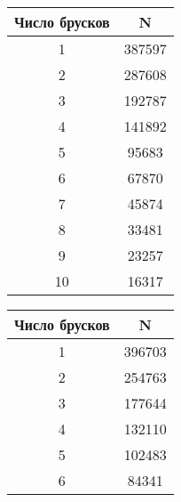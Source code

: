 \documentclass[12pt, a4paper, reqno]{article}
\begin{document}
        \begin{minipage}{0.33\textwidth}
            \centering
            \begin{tabular}{|c|c|}
                \hline
                Число брусков & N       \\ \hline\hline
                1             & 387597  \\ \hline
                2             & 287608  \\ \hline
                3             & 192787  \\ \hline
                4             & 141892  \\ \hline
                5             & 95683   \\ \hline
                6             & 67870   \\ \hline
                7             & 45874   \\ \hline
                8             & 33481   \\ \hline
                9             & 23257   \\ \hline
                10            & 16317   \\ \hline
            \end{tabular}
            \label{table:Al}
        \end{minipage}
        \begin{minipage}{0.33\textwidth}
            \centering
            \begin{tabular}{|c|c|}
                \hline
                Число брусков & N \\ \hline\hline
                1 & 396703        \\ \hline
                2 & 254763        \\ \hline
                3 & 177644        \\ \hline
                4 & 132110        \\ \hline
                5 & 102483        \\ \hline
                6 & 84341         \\ \hline
            \end{tabular}
            \label{table:Fe}
        \end{minipage}
\end{document}

